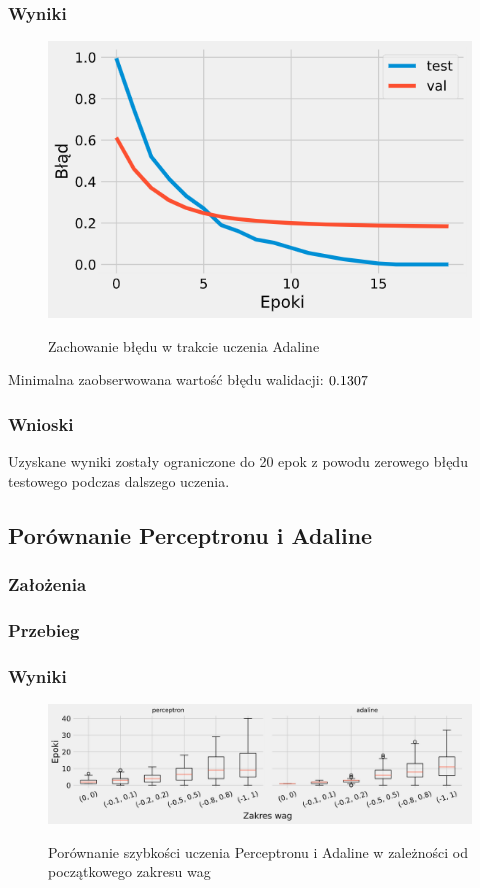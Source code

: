 \documentclass{article}
\begin{document}
\subsubsection*{Wyniki}

\begin{figure}[!h]
	\centering
	\caption{Zachowanie błędu w trakcie uczenia Adaline}
	\includegraphics[width=.5\textwidth]{ada_epsilon.png}
	\label{fig:res7}
\end{figure}

Minimalna zaobserwowana wartość błędu walidacji: \($0.1307$\)

\subsubsection*{Wnioski}

Uzyskane wyniki zostały ograniczone do 20 epok z powodu zerowego błędu testowego podczas dalszego uczenia.

\newpage
\subsection{Porównanie Perceptronu i Adaline}
\subsubsection*{Założenia}
\subsubsection*{Przebieg}
\subsubsection*{Wyniki}

\begin{figure}[!h]
	\centering
	\caption{Porównanie szybkości uczenia Perceptronu i Adaline w zależności od początkowego zakresu wag}
	\includegraphics[width=\textwidth]{ada_per_w.png}
	\label{fig:res81}
\end{figure}
\end{document}
